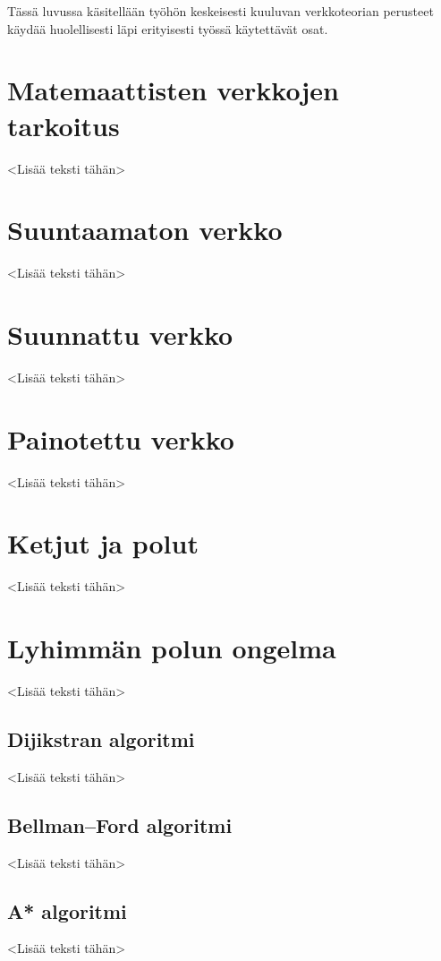 Tässä luvussa käsitellään työhön keskeisesti kuuluvan verkkoteorian perusteet käydää huolellisesti läpi erityisesti työssä käytettävät osat.

\section{Matemaattisten verkkojen tarkoitus}

<Lisää teksti tähän>

\section{Suuntaamaton verkko}

<Lisää teksti tähän>

\section{Suunnattu verkko}

<Lisää teksti tähän>

\section{Painotettu verkko}

<Lisää teksti tähän>

\section{Ketjut ja polut}

<Lisää teksti tähän>

\section{Lyhimmän polun ongelma}

<Lisää teksti tähän>

  \subsection{Dijikstran algoritmi}

  <Lisää teksti tähän>

  \subsection{Bellman–Ford algoritmi}

  <Lisää teksti tähän>

  \subsection{A* algoritmi}

  <Lisää teksti tähän>

